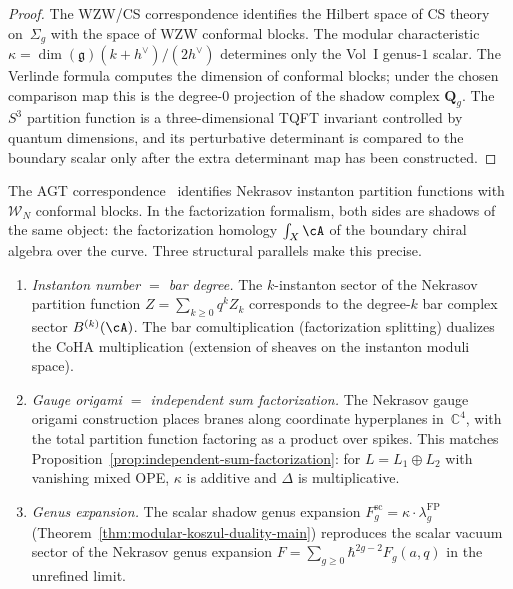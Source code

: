 \begin{proof}
The WZW/CS correspondence identifies the Hilbert space of
CS theory on~$\Sigma_g$ with the space of WZW conformal
blocks. The modular characteristic
$\kappa = \dim(\mathfrak{g})(k{+}h^\vee)/(2h^\vee)$
determines only the Vol~I genus-$1$ scalar. The Verlinde
formula computes the dimension of conformal blocks; under the
chosen comparison map this is the degree-$0$ projection of the
shadow complex $\mathbf{Q}_g$. The $S^3$ partition function is a
three-dimensional TQFT invariant controlled by quantum dimensions,
and its perturbative determinant is compared to the boundary scalar
only after the extra determinant map has been constructed.
\end{proof}

\begin{remark}

\label{rem:agt-factorization-homology}
The AGT correspondence~\cite{AGT09} identifies Nekrasov instanton
partition functions with $\mathcal{W}_N$ conformal blocks.
In the factorization formalism, both sides are shadows of the
same object: the factorization homology
$\int_X \cA$ of the boundary chiral algebra over the
curve.
Three structural parallels make this precise.
\begin{enumerate}[label=\textup{(\roman*)}]
\item \emph{Instanton number $=$ bar degree.}
The $k$-instanton sector of the Nekrasov partition function
$Z = \sum_{k \geq 0} q^k Z_k$ corresponds to the degree-$k$
bar complex sector $B^{(k)}(\cA)$.
The bar comultiplication (factorization splitting) dualizes
the CoHA multiplication (extension of sheaves on the
instanton moduli space).
\item \emph{Gauge origami $=$ independent sum factorization.}
The Nekrasov gauge origami construction places branes along
coordinate hyperplanes in~$\mathbb{C}^4$, with the total
partition function factoring as a product over spikes.
This matches
Proposition~\ref{prop:independent-sum-factorization}:
for $L = L_1 \oplus L_2$ with vanishing mixed OPE,
$\kappa$ is additive and $\Delta$ is multiplicative.
\item \emph{Genus expansion.}
The scalar shadow genus expansion
$F_g^{\mathrm{sc}} = \kappa \cdot \lambda_g^{\mathrm{FP}}$
(Theorem~\ref{thm:modular-koszul-duality-main})
reproduces the scalar vacuum sector of the Nekrasov genus expansion
$F = \sum_{g \geq 0} \hbar^{2g-2} F_g(a,q)$
in the unrefined limit.
\end{enumerate}
\end{remark}

